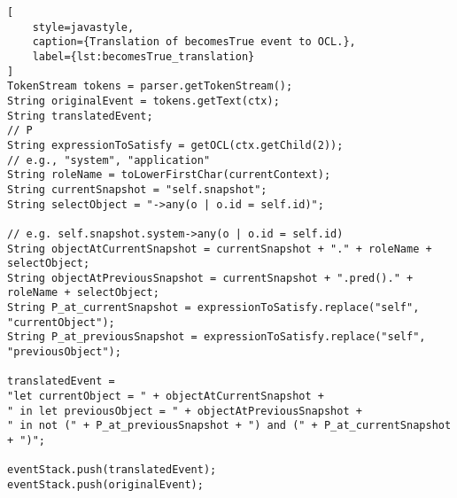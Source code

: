\begin{lstlisting}[
    style=javastyle,
    caption={Translation of becomesTrue event to OCL.},
    label={lst:becomesTrue_translation}
]
TokenStream tokens = parser.getTokenStream();
String originalEvent = tokens.getText(ctx);
String translatedEvent;
// P
String expressionToSatisfy = getOCL(ctx.getChild(2)); 
// e.g., "system", "application"
String roleName = toLowerFirstChar(currentContext); 
String currentSnapshot = "self.snapshot"; 
String selectObject = "->any(o | o.id = self.id)";

// e.g. self.snapshot.system->any(o | o.id = self.id)
String objectAtCurrentSnapshot = currentSnapshot + "." + roleName + selectObject;
String objectAtPreviousSnapshot = currentSnapshot + ".pred()." + roleName + selectObject;
String P_at_currentSnapshot = expressionToSatisfy.replace("self", "currentObject");
String P_at_previousSnapshot = expressionToSatisfy.replace("self", "previousObject");

translatedEvent = 
"let currentObject = " + objectAtCurrentSnapshot +
" in let previousObject = " + objectAtPreviousSnapshot +
" in not (" + P_at_previousSnapshot + ") and (" + P_at_currentSnapshot + ")";

eventStack.push(translatedEvent);
eventStack.push(originalEvent);    
\end{lstlisting}

